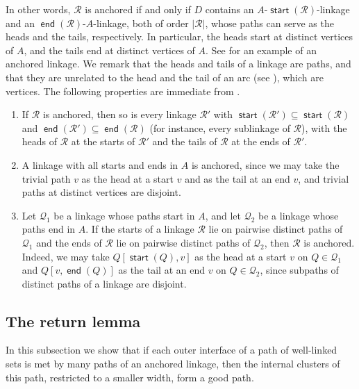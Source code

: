 \documentclass[fontsize=12pt,leading=14pt]{fullpaper}
\DeclareMathOperator{\st}{\mathsf{start}}
\DeclareMathOperator{\en}{\mathsf{end}}
\newcommand{\Qcal}{\mathcal{Q}}
\newcommand{\Rcal}{\mathcal{R}}
\begin{document}
In other words, $\Rcal$ is anchored if and only if $D$ contains an $A$-$\st(\Rcal)$-linkage and an $\en(\Rcal)$-$A$-linkage, both of order $|\Rcal|$, whose paths can serve as the heads and the tails, respectively.
In particular, the heads start at distinct vertices of $A$, and the tails end at distinct vertices of $A$.
See  for an example of an anchored linkage.
We remark that the heads and tails of a linkage are paths, and that they are unrelated to the head and the tail of an arc (see ), which are vertices.
The following properties are immediate from .
\begin{enumerate}[label=\textnormal{(H\arabic*)}]
  \item\label{item:H1} If $\Rcal$ is anchored, then so is every linkage $\Rcal'$ with $\st(\Rcal')\subseteq\st(\Rcal)$ and $\en(\Rcal')\subseteq\en(\Rcal)$ (for instance, every sublinkage of $\Rcal$), with the heads of $\Rcal$ at the starts of $\Rcal'$ and the tails of $\Rcal$ at the ends of $\Rcal'$.
  \item\label{item:H2} A linkage with all starts and ends in $A$ is anchored, since we may take the trivial path $v$ as the head at a start $v$ and as the tail at an end $v$, and trivial paths at distinct vertices are disjoint.
  \item\label{item:H3} Let $\Qcal_1$ be a linkage whose paths start in $A$, and let $\Qcal_2$ be a linkage whose paths end in $A$.
    If the starts of a linkage $\Rcal$ lie on pairwise distinct paths of $\Qcal_1$ and the ends of $\Rcal$ lie on pairwise distinct paths of $\Qcal_2$, then $\Rcal$ is anchored.
    Indeed, we may take $Q[\st(Q),v]$ as the head at a start $v$ on $Q\in\Qcal_1$ and $Q[v,\en(Q)]$ as the tail at an end $v$ on $Q\in\Qcal_2$, since subpaths of distinct paths of a linkage are disjoint.
\end{enumerate}

\subsection{The return lemma}\label{sec:return}

In this subsection we show that if each outer interface of a path of well-linked sets is met by many paths of an anchored linkage, then the internal clusters of this path, restricted to a smaller width, form a good path.
\end{document}
